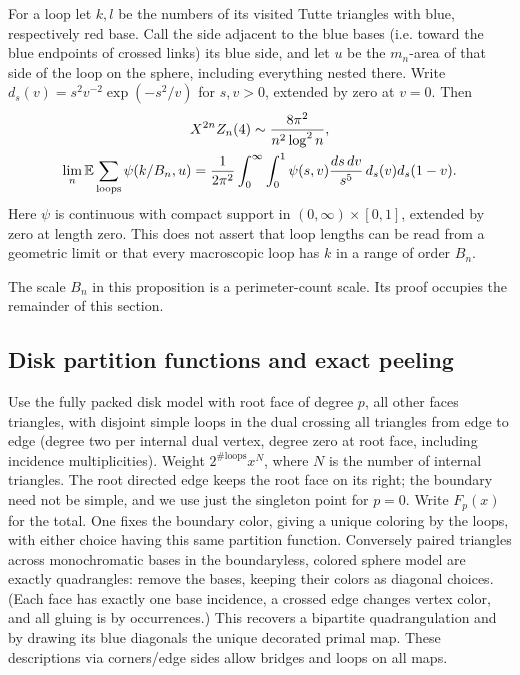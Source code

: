 \begin{proposition}\label{disk:palm}

For a loop let \(k,l\) be the numbers of its visited Tutte triangles with blue, respectively red base.
Call the side adjacent to the blue bases (i.e. toward the blue endpoints of crossed links) its blue side, and let \(u\) be the \(m_n\)-area of that side of the loop on the sphere, including everything nested there.
Write \(d_s(v)=s^2 v^{-2}\exp(-s^2/v)\) for \(s,v>0\), extended by zero at \(v=0\).
Then
\begin{equation}
\begin{gathered}
X^{2n}Z_n(4)\sim \frac{8\pi^2}{n^2\log^2 n},\\
\lim_n \mathbb E\sum_{\rm loops}\psi(k/B_n,u)
 =\frac1{2\pi^2}\int_0^\infty\int_0^1
 \psi(s,v)\frac{ds\,dv}{s^5}\,d_s(v)d_s(1-v).
\end{gathered}
 \label{eq:original-3}
\end{equation}
Here \(\psi\) is continuous with compact support in \((0,\infty)\times[0,1]\), extended by zero at length zero.
This does not assert that loop lengths can be read from a geometric limit or that every macroscopic loop has \(k\) in a range of order \(B_n\).

\end{proposition}

The scale $B_n$ in this proposition is a perimeter-count scale.  Its proof occupies the remainder of this section.

\subsection{Disk partition functions and exact peeling}\label{disk:peeling}

Use the fully packed disk model with root face of degree \(p\), all other faces triangles, with disjoint simple loops in the dual crossing all triangles from edge to edge (degree two per internal dual vertex, degree zero at root face, including incidence multiplicities).
Weight \(2^{\#\mathrm{loops}}x^{N}\), where \(N\) is the number of internal triangles.
The root directed edge keeps the root face on its right; the boundary need not be simple, and we use just the singleton point for \(p=0\).
Write \(F_p(x)\) for the total.
One fixes the boundary color, giving a unique coloring by the loops, with either choice having this same partition function.
Conversely paired triangles across monochromatic bases in the boundaryless, colored sphere model are exactly quadrangles: remove the bases, keeping their colors as diagonal choices. (Each face has exactly one base incidence, a crossed edge changes vertex color, and all gluing is by occurrences.) This recovers a bipartite quadrangulation and by drawing its blue diagonals the unique decorated primal map.
These descriptions via corners/edge sides allow bridges and loops on all maps.

